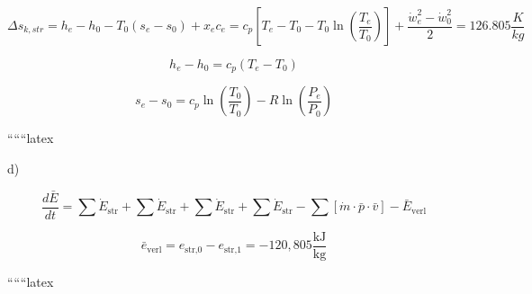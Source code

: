 \[
\Delta s_{k, str} = h_e - h_0 - T_0 (s_e - s_0) + x_e c_e = c_p [T_e - T_0 - T_0 \ln (\frac{T_e}{T_0})] + \frac{\dot{w}_e^2 - \dot{w}_0^2}{2} = 126.805 \frac{K}{kg}
\]

\[
h_e - h_0 = c_p (T_e - T_0)
\]

\[
s_e - s_0 = c_p \ln (\frac{T_0}{T_0}) - R \ln (\frac{P_e}{P_0})
\]

``````latex

d)

\[
\frac{d\bar{E}}{dt} = \sum \dot{E}_{\text{str}} + \sum \dot{E}_{\text{str}} + \sum \dot{E}_{\text{str}} + \sum \dot{E}_{\text{str}} - \sum \left[ \dot{m} \cdot \bar{p} \cdot \bar{v} \right] - \bar{E}_{\text{verl}}
\]

\[
\bar{e}_{\text{verl}} = e_{\text{str,0}} - e_{\text{str,1}} = -120,805 \frac{\text{kJ}}{\text{kg}}
\]

``````latex


